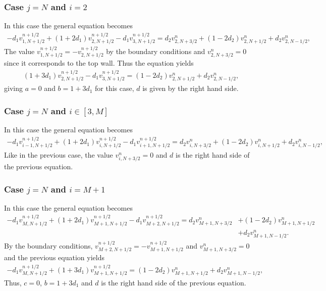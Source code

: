 \subsubsection*{Case $j=N$ and $i=2$}
In this case the general equation becomes
\begin{align*}
-d_1v_{1,N+1/2}^{n+1/2}+(1+2d_1)v_{2,N+1/2}^{n+1/2}-d_1v_{3,N+1/2}^{n+1/2}=d_2v_{2,N+3/2}^{n}+(1-2d_2)v_{2,N+1/2}^{n}+d_2v_{2,N-1/2}^{n},
\end{align*}
The value $v_{1,N+1/2}^{n+1/2}=-v_{2,N+1/2}^{n+1/2}$ by the boundary conditions and $v_{2,N+3/2}^{n}=0$ since it corresponds to the top wall. Thus the equation yields
\begin{align*}
(1+3d_1)v_{2,N+1/2}^{n+1/2}-d_1v_{3,N+1/2}^{n+1/2}=(1-2d_2)v_{2,N+1/2}^{n}+d_2v_{2,N-1/2}^{n},
\end{align*}
giving $a=0$ and $b=1+3d_1$ for this case, $d$ is given by the right hand side.

\subsubsection*{Case $j=N$ and $i\in [3,M]$}
In this case the general equation becomes
\begin{align*}
-d_1v_{i-1,N+1/2}^{n+1/2}+(1+2d_1)v_{i,N+1/2}^{n+1/2}-d_1v_{i+1,N+1/2}^{n+1/2}=d_2v_{i,N+3/2}^{n}+(1-2d_2)v_{i,N+1/2}^{n}+d_2v_{i,N-1/2}^{n},
\end{align*}
Like in the previous case, the value $v_{i,N+3/2}^{n}=0$ and $d$ is the right hand side of the previous equation.

\subsubsection*{Case $j=N$ and $i=M+1$}
In this case the general equation becomes
\begin{align*}
-d_1v_{M,N+1/2}^{n+1/2}+(1+2d_1)v_{M+1,N+1/2}^{n+1/2}-d_1v_{M+2,N+1/2}^{n+1/2}=d_2v_{M+1,N+3/2}^{n}&+(1-2d_2)v_{M+1,N+1/2}^{n}\\&+d_2v_{M+1,N-1/2}^{n}.
\end{align*}
By the boundary conditions, $v_{M+2,N+1/2}^{n+1/2}=-v_{M+1,N+1/2}^{n+1/2}$ and $v_{M+1,N+3/2}^{n}=0$ and the previous equation yields
\begin{align*}
-d_1v_{M,N+1/2}^{n+1/2}+(1+3d_1)v_{M+1,N+1/2}^{n+1/2}=(1-2d_2)v_{M+1,N+1/2}^{n}+d_2v_{M+1,N-1/2}^{n},
\end{align*}
Thus, $c=0$, $b=1+3d_1$ and $d$ is the right hand side of the previous equation.


